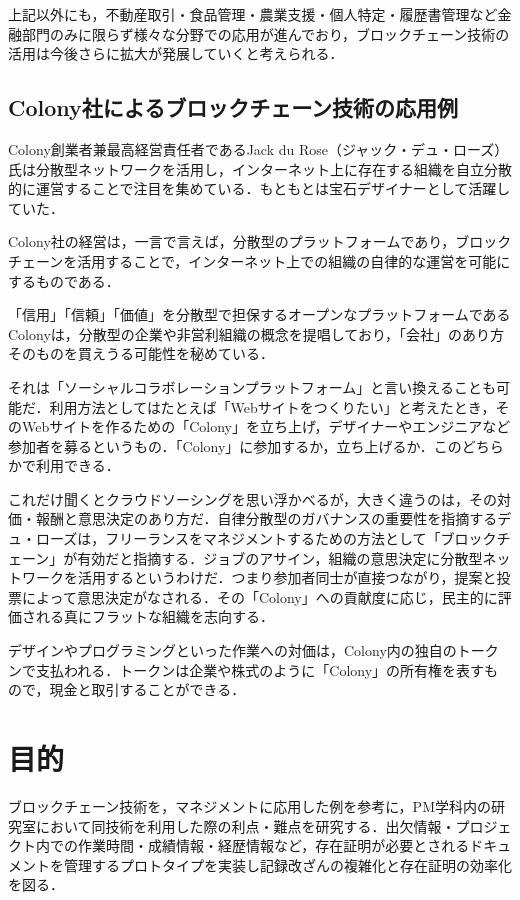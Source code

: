 上記以外にも，不動産取引・食品管理・農業支援・個人特定・履歴書管理など金融部門のみに限らず様々な分野での応用が進んでおり，ブロックチェーン技術の活用は今後さらに拡大が発展していくと考えられる．

\newpage

\section{Colony社によるブロックチェーン技術の応用例}

Colony創業者兼最高経営責任者であるJack du Rose（ジャック・デュ・ローズ）氏は分散型ネットワークを活用し，インターネット上に存在する組織を自立分散的に運営することで注目を集めている．もともとは宝石デザイナーとして活躍していた．

Colony社\cite{colony}の経営は，一言で言えば，分散型のプラットフォームであり，ブロックチェーンを活用することで，インターネット上での組織の自律的な運営を可能にするものである．

「信用」「信頼」「価値」を分散型で担保するオープンなプラットフォームであるColonyは，分散型の企業や非営利組織の概念を提唱しており，「会社」のあり方そのものを買えうる可能性を秘めている．

それは「ソーシャルコラボレーションプラットフォーム」と言い換えることも可能だ．利用方法としてはたとえば「Webサイトをつくりたい」と考えたとき，そのWebサイトを作るための「Colony」を立ち上げ，デザイナーやエンジニアなど参加者を募るというもの．「Colony」に参加するか，立ち上げるか．このどちらかで利用できる．

これだけ聞くとクラウドソーシングを思い浮かべるが，大きく違うのは，その対価・報酬と意思決定のあり方だ．自律分散型のガバナンスの重要性を指摘するデュ・ローズは，フリーランスをマネジメントするための方法として「ブロックチェーン」が有効だと指摘する．ジョブのアサイン，組織の意思決定に分散型ネットワークを活用するというわけだ．つまり参加者同士が直接つながり，提案と投票によって意思決定がなされる．その「Colony」への貢献度に応じ，民主的に評価される真にフラットな組織を志向する．

デザインやプログラミングといった作業への対価は，Colony内の独自のトークンで支払われる．トークンは企業や株式のように「Colony」の所有権を表すもので，現金と取引することができる．

\chapter{目的}

ブロックチェーン技術を，マネジメントに応用した例を参考に，PM学科内の研究室において同技術を利用した際の利点・難点を研究する．出欠情報・プロジェクト内での作業時間・成績情報・経歴情報など，存在証明が必要とされるドキュメントを管理するプロトタイプを実装し記録改ざんの複雑化と存在証明の効率化を図る．

